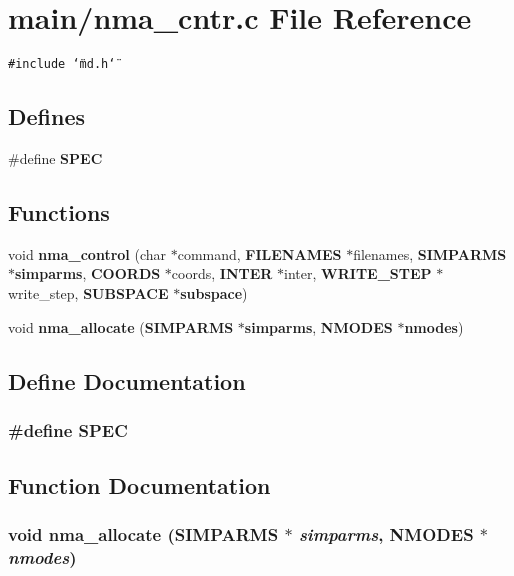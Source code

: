 \section{main/nma\_\-cntr.c File Reference}
\label{nma__cntr_8c}
{\tt \#include \char`\"{}md.h\char`\"{}}\par
\subsection*{Defines}
\begin{CompactItemize}
\item 
\#define {\bf SPEC}
\end{CompactItemize}
\subsection*{Functions}
\begin{CompactItemize}
\item 
void {\bf nma\_\-control} (char $\ast$command, {\bf FILENAMES} $\ast$filenames, {\bf SIMPARMS} $\ast${\bf simparms}, {\bf COORDS} $\ast$coords, {\bf INTER} $\ast$inter, {\bf WRITE\_\-STEP} $\ast$write\_\-step, {\bf SUBSPACE} $\ast${\bf subspace})
\item 
void {\bf nma\_\-allocate} ({\bf SIMPARMS} $\ast${\bf simparms}, {\bf NMODES} $\ast${\bf nmodes})
\end{CompactItemize}


\subsection{Define Documentation}
\subsubsection{\setlength{\rightskip}{0pt plus 5cm}\#define SPEC}\label{nma__cntr_8c_10a734b78bb8dfbb167660d7a6e2b91e}




\subsection{Function Documentation}
\subsubsection{\setlength{\rightskip}{0pt plus 5cm}void nma\_\-allocate ({\bf SIMPARMS} $\ast$ {\em simparms}, {\bf NMODES} $\ast$ {\em nmodes})}\label{nma__cntr_8c_7882405e314f23b52ec5c9973c6fa513}


